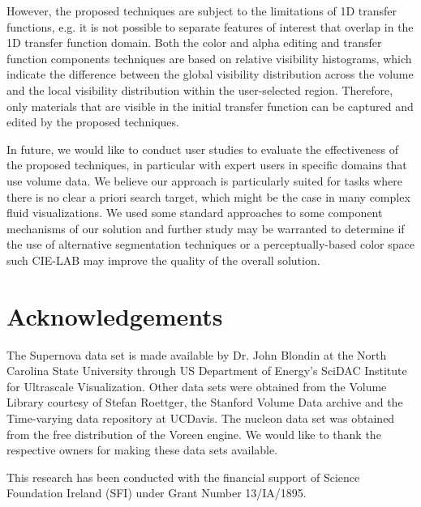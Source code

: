\documentclass[twoside,twocolumn,10pt]{article}
\begin{document}
However, the proposed techniques are subject to the limitations of 1D transfer functions, e.g. it is not possible to separate features of interest that overlap in the 1D transfer function domain.
Both the color and alpha editing and transfer function components techniques are based on relative visibility histograms, which indicate the difference between the global visibility distribution across the volume and the local visibility distribution within the user-selected region. Therefore, only materials that are visible in the initial transfer function can be captured and edited by the proposed techniques.

In future, we would like to conduct user studies to evaluate the effectiveness of the proposed techniques, in particular with expert users in specific domains that use volume data. We believe our approach is particularly suited for tasks where there is no clear a priori search target, which might be the case in many complex fluid visualizations. We used some standard approaches to some component mechanisms of our solution and further study may be warranted to determine if the use of alternative segmentation techniques or a perceptually-based color space such CIE-LAB may improve the quality of the overall solution.

\section{Acknowledgements}


The Supernova data set is made available by Dr. John Blondin at the North Carolina State University through US Department of Energy's SciDAC Institute for Ultrascale Visualization. Other data sets were obtained from the Volume Library courtesy of Stefan Roettger, the Stanford Volume Data archive and the Time-varying data repository at UCDavis. The nucleon data set was obtained from the free distribution of the Voreen engine. We would like to thank the respective owners for making these data sets available.

This research has been conducted with the financial support of Science Foundation Ireland (SFI) under Grant Number 13/IA/1895.

%
%
\end{document}
